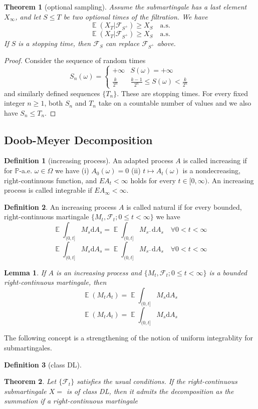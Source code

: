 \documentclass{article}
\newtheorem{Thm}{Theorem}[section]
\newtheorem{Lem}{Lemma}[section]
\theoremstyle{definition}
\newtheorem{Def}{Definition}[section]
\newcommand{\EE}{\operatorname{\mathbb{E}}}
\newcommand{\PP}{\mathbb{P}}
\renewcommand{\leq}{\leqslant}
\renewcommand{\geq}{\geqslant}
\newcommand{\<}{\left\langle}
\renewcommand{\>}{\right\rangle}
\begin{document}
\begin{Thm}[optional sampling]
    Assume the submartingale has a last element $X_\infty$,
    and let $S\leq T$ be two optional times of the filtration. We have 
    \[ \EE(X_T|\mathcal{F}_{S^+})\geq X_S \quad \text{a.s.}\] 
    \[ \EE(X_T|\mathcal{F}_{S^+})\geq X_S \quad \text{a.s.}\] 
    If $S$ is a stopping time, then $\mathcal{F}_S$ can replace $\mathcal{F}_{S^+}$ above.
\end{Thm}
\begin{proof}
    Consider the sequence of random times 
    \[S_n(\omega)=\left\{\begin{matrix}
        +\infty   & S(\omega )=+\infty \\
        \frac{k}{2^n}   & \frac{k-1}{2^n} \leq S(\omega )<\frac{k}{2^n} 
        \end{matrix}\right. \]
    and similarly defined sequences $\{T_n\}$. These are stopping times.
    For every fixed integer $n\geq 1$, both $S_n$ and $T_n$ take on a countable number of values and we also have $S_n\leq T_n$.
\end{proof}


\subsection{Doob-Meyer Decomposition}
\begin{Def}[increasing process]
    An adapted process $A$ is called increasing if for $\PP$-a.e. $\omega\in\Omega$ we have \newline 
    (i) $A_0(\omega)=0$\newline 
    (ii) $t\mapsto A_t(\omega)$ is a nondecreasing, right-continuous function, and $EA_t<\infty$ holds for every $t\in [0,\infty)$.\newline 
    An increasing process is called integrable if $EA_\infty<\infty$.
\end{Def}
\begin{Def}
    An increasing process $A$ is called natural if for every bounded, right-continuous martingale $\{M_t,\mathcal{F}_t;0\leq t<\infty\}$ we have
    \[ \EE\int_{(0,t]}M_s\mathrm{d}A_s=\EE\int_{(0,t]}M_{s^-}\mathrm{d}A_s\quad\forall 0<t<\infty\]
    \[ \EE\int_{(0,t]}M_s\mathrm{d}A_s=\EE\int_{(0,t]}M_{s^-}\mathrm{d}A_s\quad\forall 0<t<\infty\]
\end{Def}
\begin{Lem}
    If $A$ is an increasing process and $\{M_t,\mathcal{F}_t;0\leq t<\infty\}$ is a bounded right-continuous martingale, then 
    \[ \EE(M_tA_t)=\EE\int_{(0,t]}M_s\mathrm{d}A_s \]
    \[ \EE(M_tA_t)=\EE\int_{(0,t]}M_s\mathrm{d}A_s \]
\end{Lem}
The following concept is a strengthening of the notion of uniform integrablity for submartingales.
\begin{Def}[class DL]
    
\end{Def}
\begin{Thm}
    Let $\{\mathcal{F}_t\}$ satisfies the usual conditions. If the right-continuous submartingale $X=$ is of class DL,
    then it admits the decomposition as the summation if a right-continuous martingale
\end{Thm}
\end{document}
